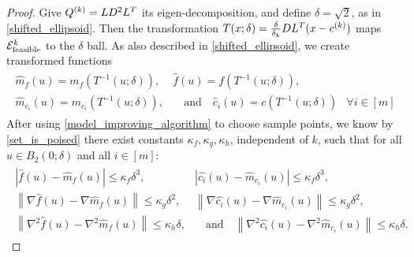 \begin{proof}

Give ${Q^{(k)}} = LD^2L^T$ its eigen-decomposition, and define 
$\delta = \sqrt{2}$,
as in \cref{shifted_ellipsoid}.
Then the transformation $T(x; \delta) = \frac{\delta}{\delta_k} D L^T(x - c^{(k)})$ maps ${\mathcal E^k_{\textrm{feasible}}}$ to the $\delta$ ball.
As also described in \cref{shifted_ellipsoid}, we create transformed functions
\begin{align*}
\begin{array}{ccc}
\hat {m}_f(u) = m_f(T^{-1}(u; \delta)),&  \hat f (u) = f(T^{-1}(u; \delta)), &\\
\hat {m}_{c_i}(u) = m_{c_i}(T^{-1}(u; \delta)), &  \quad \textrm{and} \quad \hat c_i (u) = c(T^{-1}(u; \delta))& \forall i \in [m]
\end{array}
\end{align*}
After using \cref{model_improving_algorithm} to choose sample points, we know by \cref{set_is_poised} 
there exist constants $\kappa_f, \kappa_g, \kappa_h$, independent of $k$, such that for all $u \in B_2(0; \delta)$ and all $i \in [m]$:
\begin{align*}
\begin{array}{cc}
\left| \hat {f}\left(u\right) -  \hat{m}_f\left(u\right) \right|\le \kappa_f \delta^3, &
\left| \hat {{c_i}}\left(u\right) -  \hat{m}_{c_i}\left(u\right) \right|\le \kappa_f \delta^3, \\
\left\|\nabla \hat {f}\left(u\right) - \nabla \hat{m}_f\left(u\right) \right\|\le \kappa_g \delta^2, &
\left\|\nabla \hat {{c_i}}\left(u\right) - \nabla \hat{m}_{c_i}\left(u\right) \right\|\le \kappa_g \delta^2, \\
\left\|\nabla^2 \hat {f}\left(u\right) - \nabla^2 \hat{m}_f\left(u\right) \right\|\le \kappa_h \delta, &
\quad \textrm{and} \quad \left\|\nabla^2 \hat {{c_i}}\left(u\right) - \nabla^2 \hat{m}_{c_i}\left(u\right) \right\|\le \kappa_h \delta.
\end{array}
\end{align*}

\end{proof}
